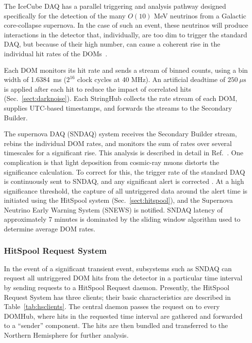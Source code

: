 The IceCube DAQ has a parallel triggering and analysis pathway designed
specifically for the detection of the many $O(10)$ MeV neutrinos from a
Galactic core-collapse supernova.  In the case of such an event, these
neutrinos will produce interactions in
the detector that, individually, are too dim to trigger the standard DAQ,
but because of their high number, can cause a coherent rise in the
individual hit rates of the DOMs~\cite{IC3:supernova}.

Each DOM monitors its hit rate and sends a stream of binned counts, using a
bin width of 1.6384~ms ($2^{16}$ clock cycles at 40 MHz).  An artificial
deadtime of $250\ {\mu}\mathrm{s}$ is applied after each hit to reduce the
impact of correlated hits (Sec.~\ref{sect:darknoise}).  Each
StringHub collects the rate stream of each DOM, supplies UTC-based timestamps,
and forwards the streams to the Secondary Builder.

The supernova DAQ (SNDAQ) system receives the Secondary Builder stream,
rebins the individual DOM rates, and monitors the sum of rates over several
timescales for a significant rise.  This analysis is described in
detail in Ref.~\cite{IC3:supernova}.  One complication is that light
deposition from cosmic-ray muons distorts the significance
calculation.  To correct for this, the trigger rate of the standard DAQ is
continuously sent to SNDAQ, and any significant alert is corrected
\cite{IC3:icrc15_sndaq}.  At a high significance threshold, the capture of
all untriggered data around the alert time is initiated using the HitSpool
system (Sec.~\ref{sect:hitspool}), and the Supernova Neutrino Early Warning
System (SNEWS) \cite{SNEWS} is notified.  SNDAQ latency of approximately 7
minutes is dominated by the sliding window algorithm used to determine
average DOM rates. 

\subsubsection{\label{sect:hitspool}HitSpool Request System}

In the event of a significant transient event, subsystems such as SNDAQ can
request all untriggered DOM hits from the detector in 
a particular time interval by sending requests to a HitSpool Request daemon. Presently,
the HitSpool Request System has three clients; 
their basic characteristics are described in
Table~\ref{tab:hsclients}.  The central daemon passes the request on to 
every DOMHub, where hits in the requested time
interval are gathered and forwarded to a ``sender'' component.  The hits
are then bundled and transferred to the Northern Hemisphere for further analysis.

